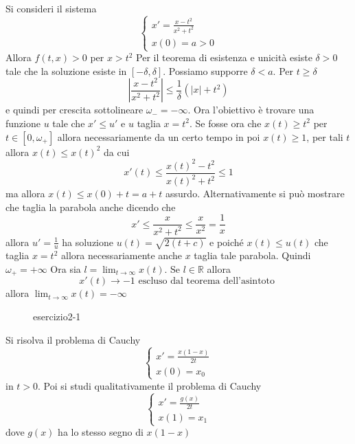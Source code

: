 \begin{eser}
    Si consideri il sistema
    \[
        \begin{cases}
            x' = \frac{x - t^2}{x^2 + t^2} \\
            x{(0)} = a > 0
        \end{cases}
    \]
    Allora \(f{(t, x)} > 0\) per \(x > t^2\) 
    Per il teorema di esistenza e unicità esiste \(\delta > 0\) tale che la
    soluzione esiste in \([-\delta, \delta]\). Possiamo supporre \(\delta < a\).
    Per \(t \ge \delta\) 
    \[
        \left| \frac{x-t^2}{x^2 + t^2} \right| \le \frac{1}{\delta} {\left(
        |x|+t^2 \right)} 
    \]
    e quindi per crescita sottolineare \(\omega_- = -\infty\). 
    Ora l'obiettivo è trovare una funzione \(u\) tale che \(x' \le u'\) e \(u\)
    taglia \(x = t^2\). Se fosse ora che \(x{(t)} \ge t^2\) per \(t \in [0,
    \omega_+]\) allora necessariamente da un certo tempo in poi \(x {(t)} \ge
    1\), per tali \(t\) allora \(x{(t)}\le x{(t)}^2\) da cui
    \[
        x'{(t)} \le \frac{x{(t)}^2 - t^2}{x{(t)}^2 + t ^2} \le  1
    \]
    ma allora \(x{(t)}\le x{(0)} + t = a +t\) assurdo. Alternativamente si può
    mostrare che taglia la parabola anche dicendo che
    \[
        x' \le \frac{x}{x^2 + t ^2} \le \frac{x}{x^2} = \frac{1}{x}
    \]
    allora \(u' = \frac{1}{u}\) ha soluzione \(u{(t)} = \sqrt{2{(t+c)}}\) e
    poiché \(x{(t)} \le u{(t)}\) che taglia \(x=t^2\) allora necessariamente
    anche \(x\) taglia tale parabola. Quindi \(\omega_+ = +\infty\) 
    Ora sia \( l = \lim_{t \to \infty} x{(t)}\). Se \( l \in \mathbb{R}\) allora
    \[
        x'{(t)} \to -1 \text{ escluso dal teorema dell'asintoto }
    \]
    allora \(\lim_{t \to \infty} x{(t)} = - \infty\) 
\end{eser}
\begin{figure}[ht]
    \centering
    \caption{esercizio2-1}
    \label{fig:esercizio2-1}
\end{figure}
\begin{eser}
    Si risolva il problema di Cauchy
    \[
        \begin{cases}
            x' = \frac{x{(1-x)}}{2t}\\
            x{(0)} = x_{0}
        \end{cases}
    \]
    in \(t > 0\). Poi si studi qualitativamente il problema di Cauchy
    \[
        \begin{cases}
            x' = \frac{g{(x)}}{2t} \\
            x{(1)} = x_{1}
        \end{cases}
    \]
    dove \(g{(x)}\) ha lo stesso segno di \(x {(1-x)}\) 
\end{eser}


